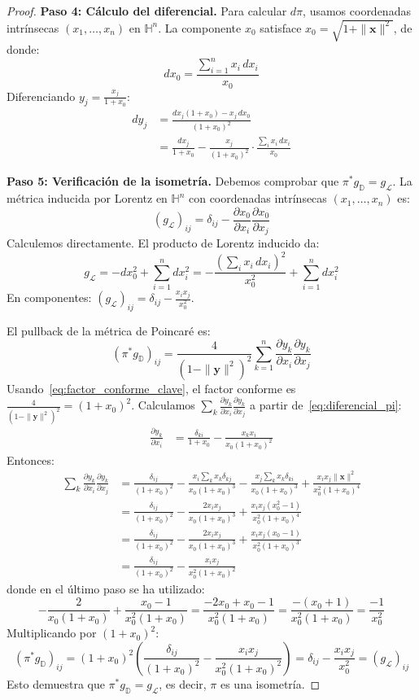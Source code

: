 \begin{proof}
\textbf{Paso 4: Cálculo del diferencial.}
Para calcular $d\pi$, usamos coordenadas intrínsecas $(x_1, \ldots, x_n)$ en $\mathbb{H}^n$. La componente $x_0$ satisface $x_0 = \sqrt{1 + \|\mathbf{x}\|^2}$, de donde:
\[
dx_0 = \frac{\sum_{i=1}^n x_i \, dx_i}{x_0}
\]
Diferenciando $y_j = \frac{x_j}{1+x_0}$:
\begin{align}
dy_j &= \frac{dx_j(1+x_0) - x_j \, dx_0}{(1+x_0)^2} \nonumber \\
&= \frac{dx_j}{1+x_0} - \frac{x_j}{(1+x_0)^2} \cdot \frac{\sum_i x_i \, dx_i}{x_0} \label{eq:diferencial_pi}
\end{align}

\textbf{Paso 5: Verificación de la isometría.}
Debemos comprobar que $\pi^* g_{\mathbb{D}} = g_{\mathcal{L}}$. La métrica inducida por Lorentz en $\mathbb{H}^n$ con coordenadas intrínsecas $(x_1, \ldots, x_n)$ es:
\[
(g_{\mathcal{L}})_{ij} = \delta_{ij} - \frac{\partial x_0}{\partial x_i} \frac{\partial x_0}{\partial x_j}
\]
Calculemos directamente. El producto de Lorentz inducido da:
\[
g_{\mathcal{L}} = -dx_0^2 + \sum_{i=1}^n dx_i^2 = -\frac{(\sum_i x_i \, dx_i)^2}{x_0^2} + \sum_{i=1}^n dx_i^2
\]
En componentes: $(g_{\mathcal{L}})_{ij} = \delta_{ij} - \frac{x_i x_j}{x_0^2}$.

El pullback de la métrica de Poincaré es:
\[
(\pi^* g_{\mathbb{D}})_{ij} = \frac{4}{(1-\|\mathbf{y}\|^2)^2} \sum_{k=1}^n \frac{\partial y_k}{\partial x_i} \frac{\partial y_k}{\partial x_j}
\]
Usando~\eqref{eq:factor_conforme_clave}, el factor conforme es $\frac{4}{(1-\|\mathbf{y}\|^2)^2} = (1+x_0)^2$. Calculamos $\sum_k \frac{\partial y_k}{\partial x_i}\frac{\partial y_k}{\partial x_j}$ a partir de~\eqref{eq:diferencial_pi}:
\begin{align*}
\frac{\partial y_k}{\partial x_i} &= \frac{\delta_{ki}}{1+x_0} - \frac{x_k x_i}{x_0(1+x_0)^2}
\end{align*}
Entonces:
\begin{align*}
\sum_{k} \frac{\partial y_k}{\partial x_i}\frac{\partial y_k}{\partial x_j} &= \frac{\delta_{ij}}{(1+x_0)^2} - \frac{x_i \sum_k x_k \delta_{kj}}{x_0(1+x_0)^3} - \frac{x_j \sum_k x_k \delta_{ki}}{x_0(1+x_0)^3} + \frac{x_i x_j \|\mathbf{x}\|^2}{x_0^2(1+x_0)^4} \\
&= \frac{\delta_{ij}}{(1+x_0)^2} - \frac{2 x_i x_j}{x_0(1+x_0)^3} + \frac{x_i x_j (x_0^2 - 1)}{x_0^2(1+x_0)^4} \\
&= \frac{\delta_{ij}}{(1+x_0)^2} - \frac{2 x_i x_j}{x_0(1+x_0)^3} + \frac{x_i x_j (x_0 - 1)}{x_0^2(1+x_0)^3} \\
&= \frac{\delta_{ij}}{(1+x_0)^2} - \frac{x_i x_j}{x_0^2(1+x_0)^2}
\end{align*}
donde en el último paso se ha utilizado:
\[
-\frac{2}{x_0(1+x_0)} + \frac{x_0-1}{x_0^2(1+x_0)} = \frac{-2x_0 + x_0 - 1}{x_0^2(1+x_0)} = \frac{-(x_0+1)}{x_0^2(1+x_0)} = \frac{-1}{x_0^2}
\]
Multiplicando por $(1+x_0)^2$:
\[
(\pi^* g_{\mathbb{D}})_{ij} = (1+x_0)^2 \left(\frac{\delta_{ij}}{(1+x_0)^2} - \frac{x_i x_j}{x_0^2(1+x_0)^2}\right) = \delta_{ij} - \frac{x_i x_j}{x_0^2} = (g_{\mathcal{L}})_{ij}
\]
Esto demuestra que $\pi^* g_{\mathbb{D}} = g_{\mathcal{L}}$, es decir, $\pi$ es una isometría.
\end{proof}

